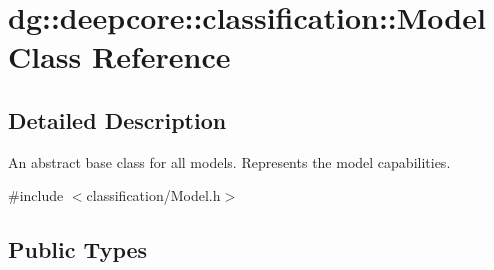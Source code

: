 \hypertarget{classdg_1_1deepcore_1_1classification_1_1_model}{}\section{dg\+:\+:deepcore\+:\+:classification\+:\+:Model Class Reference}
\label{classdg_1_1deepcore_1_1classification_1_1_model}


\subsection{Detailed Description}
An abstract base class for all models. Represents the model capabilities. 

{\ttfamily \#include $<$classification/\+Model.\+h$>$}

\subsection*{Public Types}
